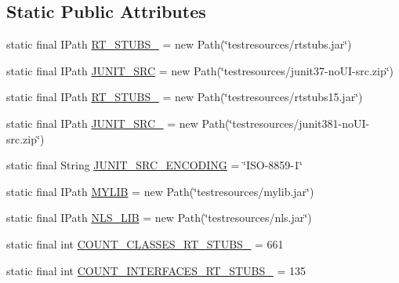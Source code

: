 \subsection*{Static Public Attributes}
\begin{DoxyCompactItemize}
\item 
static final IPath \hyperlink{classorg_1_1eclipse_1_1jdt_1_1ui_1_1tests_1_1refactoring_1_1infra_1_1JavaProjectHelper_a25c1dc7863be515c696975db13e6908e}{RT\_\-STUBS\_} = new Path(\char`\"{}testresources/rtstubs.jar\char`\"{})
\item 
static final IPath \hyperlink{classorg_1_1eclipse_1_1jdt_1_1ui_1_1tests_1_1refactoring_1_1infra_1_1JavaProjectHelper_af51571e2c282dc955d763c8aa6d74d0b}{JUNIT\_\-SRC} = new Path(\char`\"{}testresources/junit37-\/noUI-\/src.zip\char`\"{})
\item 
static final IPath \hyperlink{classorg_1_1eclipse_1_1jdt_1_1ui_1_1tests_1_1refactoring_1_1infra_1_1JavaProjectHelper_ab9682099e6b3300bd32cf650a6bb9b8a}{RT\_\-STUBS\_} = new Path(\char`\"{}testresources/rtstubs15.jar\char`\"{})
\item 
static final IPath \hyperlink{classorg_1_1eclipse_1_1jdt_1_1ui_1_1tests_1_1refactoring_1_1infra_1_1JavaProjectHelper_a31fe8a61eb699994d99273c9d3996172}{JUNIT\_\-SRC\_} = new Path(\char`\"{}testresources/junit381-\/noUI-\/src.zip\char`\"{})
\item 
static final String \hyperlink{classorg_1_1eclipse_1_1jdt_1_1ui_1_1tests_1_1refactoring_1_1infra_1_1JavaProjectHelper_a4800d44dacf636af372611d1ffb6d8a1}{JUNIT\_\-SRC\_\-ENCODING} = \char`\"{}ISO-\/8859-\/1\char`\"{}
\item 
static final IPath \hyperlink{classorg_1_1eclipse_1_1jdt_1_1ui_1_1tests_1_1refactoring_1_1infra_1_1JavaProjectHelper_aaf4b86adc0576d9e3eba268ab1afee22}{MYLIB} = new Path(\char`\"{}testresources/mylib.jar\char`\"{})
\item 
static final IPath \hyperlink{classorg_1_1eclipse_1_1jdt_1_1ui_1_1tests_1_1refactoring_1_1infra_1_1JavaProjectHelper_ab065fefae002b3356342e1ff056da45c}{NLS\_\-LIB} = new Path(\char`\"{}testresources/nls.jar\char`\"{})
\item 
static final int \hyperlink{classorg_1_1eclipse_1_1jdt_1_1ui_1_1tests_1_1refactoring_1_1infra_1_1JavaProjectHelper_aabe3ec975531ede97506dc8840f50c1e}{COUNT\_\-CLASSES\_\-RT\_\-STUBS\_} = 661
\item 
static final int \hyperlink{classorg_1_1eclipse_1_1jdt_1_1ui_1_1tests_1_1refactoring_1_1infra_1_1JavaProjectHelper_ada6902cb610a070f60612b3ae068f626}{COUNT\_\-INTERFACES\_\-RT\_\-STUBS\_} = 135

\end{DoxyCompactItemize}
